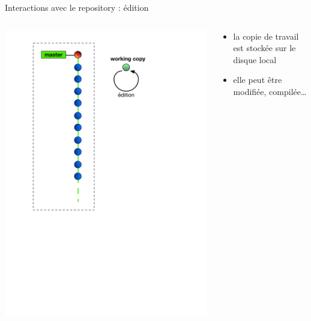 \begin{frame}{%
\protect\hypertarget{interactions-avec-le-repository-uxe9dition}{%
Interactions avec le repository : édition}}

\begin{columns}[T]
\begin{column}{0.40\textwidth}
\includegraphics[height=1.5\textwidth]{images/edition.pdf}
\end{column}

\begin{column}{0.60\textwidth}
\begin{itemize}
\tightlist
\item
  la copie de travail est stockée sur le disque local
\item
  elle peut être modifiée, compilée\ldots{}
\end{itemize}
\end{column}
\end{columns}

\end{frame}


